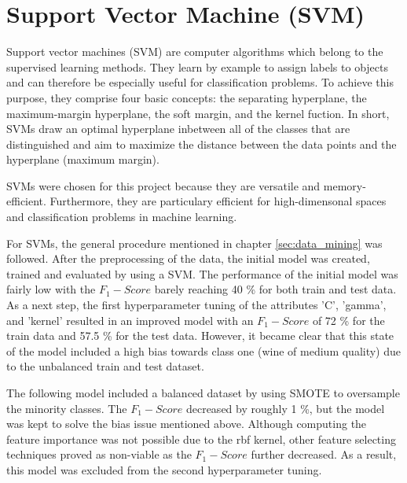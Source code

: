 \section{Support Vector Machine (SVM)}


Support vector machines (SVM) are computer algorithms which belong to the supervised learning methods. They learn by example to assign labels to objects and can therefore be especially useful for classification problems. To achieve this purpose, they comprise four basic concepts: the separating hyperplane, the maximum-margin hyperplane, the soft margin, and the kernel fuction. In short, SVMs draw an optimal hyperplane inbetween all of the classes that are distinguished and aim to maximize the distance between the data points and the hyperplane (maximum margin).\cite{Noble2006}

SVMs were chosen for this project because they are versatile and memory-efficient. Furthermore, they are particulary efficient for high-dimensonal spaces and classification problems in machine learning.\cite{ScikitLearn2021}

For SVMs, the general procedure mentioned in chapter \ref{sec:data_mining} was followed. After the preprocessing of the data, the initial model was created, trained and evaluated by using a SVM. The performance of the initial model was fairly low with the $F_1-Score$ barely reaching 40 \% for both train and test data. As a next step, the first hyperparameter tuning of the attributes 'C', 'gamma', and 'kernel' resulted in an improved model with an $F_1-Score$ of 72 \% for the train data and 57.5 \% for the test data. However, it became clear that this state of the model included a high bias towards class one (wine of medium quality) due to the unbalanced train and test dataset. 

The following model included a balanced dataset by using SMOTE to oversample the minority classes. The $F_1-Score$ decreased by roughly 1 \%, but the model was kept to solve the bias issue mentioned above. Although computing the feature importance was not possible due to the rbf kernel, other feature selecting techniques proved as non-viable as the $F_1-Score$ further decreased. As a result, this model was excluded from the second hyperparameter tuning. 


